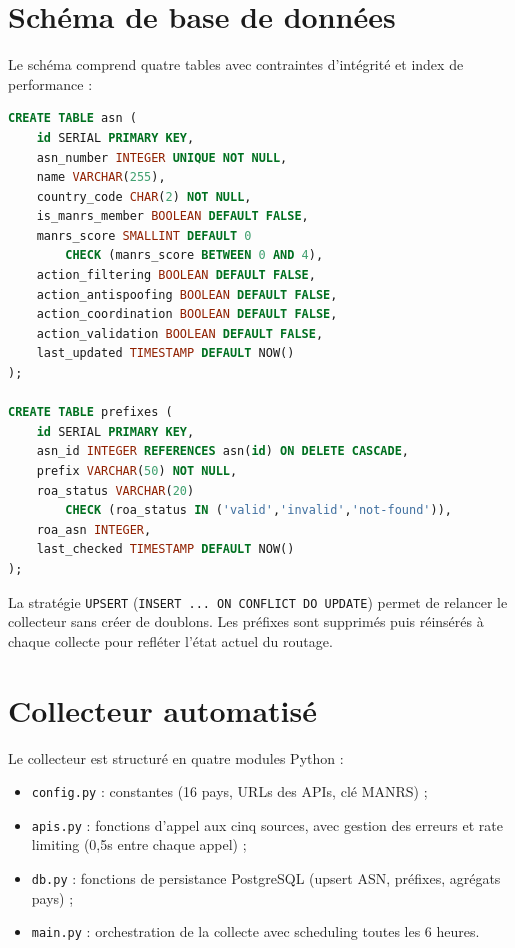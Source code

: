\documentclass{eneam}
\begin{document}
\section{Schéma de base de données}

Le schéma comprend quatre tables avec contraintes d'intégrité et index de performance :

\begin{lstlisting}[language=SQL, caption={Schéma de base de données (extrait)}]
CREATE TABLE asn (
    id SERIAL PRIMARY KEY,
    asn_number INTEGER UNIQUE NOT NULL,
    name VARCHAR(255),
    country_code CHAR(2) NOT NULL,
    is_manrs_member BOOLEAN DEFAULT FALSE,
    manrs_score SMALLINT DEFAULT 0
        CHECK (manrs_score BETWEEN 0 AND 4),
    action_filtering BOOLEAN DEFAULT FALSE,
    action_antispoofing BOOLEAN DEFAULT FALSE,
    action_coordination BOOLEAN DEFAULT FALSE,
    action_validation BOOLEAN DEFAULT FALSE,
    last_updated TIMESTAMP DEFAULT NOW()
);

CREATE TABLE prefixes (
    id SERIAL PRIMARY KEY,
    asn_id INTEGER REFERENCES asn(id) ON DELETE CASCADE,
    prefix VARCHAR(50) NOT NULL,
    roa_status VARCHAR(20)
        CHECK (roa_status IN ('valid','invalid','not-found')),
    roa_asn INTEGER,
    last_checked TIMESTAMP DEFAULT NOW()
);
\end{lstlisting}

La stratégie \texttt{UPSERT} (\texttt{INSERT ... ON CONFLICT DO UPDATE}) permet de relancer le collecteur sans créer de doublons. Les préfixes sont supprimés puis réinsérés à chaque collecte pour refléter l'état actuel du routage.

\section{Collecteur automatisé}

Le collecteur est structuré en quatre modules Python :

\begin{itemize}
    \item \texttt{config.py} : constantes (16 pays, URLs des APIs, clé MANRS) ;
    \item \texttt{apis.py} : fonctions d'appel aux cinq sources, avec gestion des erreurs et rate limiting (0,5s entre chaque appel) ;
    \item \texttt{db.py} : fonctions de persistance PostgreSQL (upsert ASN, préfixes, agrégats pays) ;
    \item \texttt{main.py} : orchestration de la collecte avec scheduling toutes les 6 heures.
\end{itemize}
\end{document}
